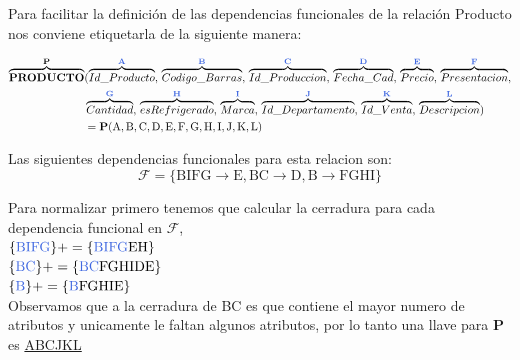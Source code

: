 \documentclass[10pt]{article}
\begin{document}



Para facilitar la definición de las dependencias funcionales de la relación Producto nos conviene etiquetarla de la siguiente manera:

\begin{align*}
\overbrace{ \textbf{PRODUCTO}}^{\textbf{{P}}}&(\overbrace{ Id\_Producto}^{\textbf{\textcolor{RoyalBlue}{A}}},\,\overbrace{Codigo\_Barras}^{\textbf{\textcolor{RoyalBlue}{B}}},\,\overbrace{Id\_Produccion}^{\textbf{\textcolor{RoyalBlue}{C}}},\,\overbrace{Fecha\_Cad}^{\textbf{\textcolor{RoyalBlue}{D}}},\,\overbrace{Precio}^{\textbf{\textcolor{RoyalBlue}{E}}},\,\overbrace{Presentacion}^{\textbf{\textcolor{RoyalBlue}{F}}},\\&\overbrace{Cantidad}^{\textbf{\textcolor{RoyalBlue}{G}}},\,\overbrace{esRefrigerado}^{\textbf{\textcolor{RoyalBlue}{H}}},\,\overbrace{Marca}^{\textbf{\textcolor{RoyalBlue}{I}}},\,\overbrace{Id\_Departamento}^{\textbf{\textcolor{RoyalBlue}{J}}},\,\overbrace{Id\_Venta}^{\textbf{\textcolor{RoyalBlue}{K}}},\,\overbrace{Descripcion}^{\textbf{\textcolor{RoyalBlue}{L}}})\\
&= \textbf{P}(\mathrm{A,B,C,D,E,F,G,H,I,J,K,L})
\end{align*}

Las siguientes dependencias funcionales para esta relacion son:\\

$$\mathcal{F}=\mathrm{\{ BIFG \rightarrow E, BC \rightarrow D, B \rightarrow FGHI \}}$$

Para normalizar primero tenemos que calcular la cerradura para cada dependencia funcional en $\mathcal{F}$,\\


$\mathrm{\{\textcolor{RoyalBlue}{BIFG}\}+= \{\textcolor{RoyalBlue}{BIFG}EH\}}$\\

$\mathrm{\{\textcolor{RoyalBlue}{BC}\}+= \{\textcolor{RoyalBlue}{BC}FGHIDE\}}$\\

$\mathrm{\{\textcolor{RoyalBlue}{B}\}+= \{\textcolor{RoyalBlue}{B}FGHIE\}}$\\


Observamos que a la cerradura de BC es que contiene el mayor numero de atributos y unicamente le faltan algunos atributos, por lo tanto una llave para \textbf{P} es \underline{ABCJKL} \\
\end{document}
